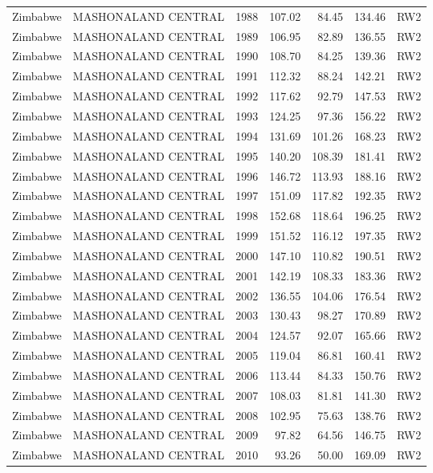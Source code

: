 \begin{longtable}{lllrrrl}
  Zimbabwe & MASHONALAND CENTRAL & 1988 & 107.02 & 84.45 & 134.46 & RW2 \\ 
  Zimbabwe & MASHONALAND CENTRAL & 1989 & 106.95 & 82.89 & 136.55 & RW2 \\ 
  Zimbabwe & MASHONALAND CENTRAL & 1990 & 108.70 & 84.25 & 139.36 & RW2 \\ 
  Zimbabwe & MASHONALAND CENTRAL & 1991 & 112.32 & 88.24 & 142.21 & RW2 \\ 
  Zimbabwe & MASHONALAND CENTRAL & 1992 & 117.62 & 92.79 & 147.53 & RW2 \\ 
  Zimbabwe & MASHONALAND CENTRAL & 1993 & 124.25 & 97.36 & 156.22 & RW2 \\ 
  Zimbabwe & MASHONALAND CENTRAL & 1994 & 131.69 & 101.26 & 168.23 & RW2 \\ 
  Zimbabwe & MASHONALAND CENTRAL & 1995 & 140.20 & 108.39 & 181.41 & RW2 \\ 
  Zimbabwe & MASHONALAND CENTRAL & 1996 & 146.72 & 113.93 & 188.16 & RW2 \\ 
  Zimbabwe & MASHONALAND CENTRAL & 1997 & 151.09 & 117.82 & 192.35 & RW2 \\ 
  Zimbabwe & MASHONALAND CENTRAL & 1998 & 152.68 & 118.64 & 196.25 & RW2 \\ 
  Zimbabwe & MASHONALAND CENTRAL & 1999 & 151.52 & 116.12 & 197.35 & RW2 \\ 
  Zimbabwe & MASHONALAND CENTRAL & 2000 & 147.10 & 110.82 & 190.51 & RW2 \\ 
  Zimbabwe & MASHONALAND CENTRAL & 2001 & 142.19 & 108.33 & 183.36 & RW2 \\ 
  Zimbabwe & MASHONALAND CENTRAL & 2002 & 136.55 & 104.06 & 176.54 & RW2 \\ 
  Zimbabwe & MASHONALAND CENTRAL & 2003 & 130.43 & 98.27 & 170.89 & RW2 \\ 
  Zimbabwe & MASHONALAND CENTRAL & 2004 & 124.57 & 92.07 & 165.66 & RW2 \\ 
  Zimbabwe & MASHONALAND CENTRAL & 2005 & 119.04 & 86.81 & 160.41 & RW2 \\ 
  Zimbabwe & MASHONALAND CENTRAL & 2006 & 113.44 & 84.33 & 150.76 & RW2 \\ 
  Zimbabwe & MASHONALAND CENTRAL & 2007 & 108.03 & 81.81 & 141.30 & RW2 \\ 
  Zimbabwe & MASHONALAND CENTRAL & 2008 & 102.95 & 75.63 & 138.76 & RW2 \\ 
  Zimbabwe & MASHONALAND CENTRAL & 2009 & 97.82 & 64.56 & 146.75 & RW2 \\ 
  Zimbabwe & MASHONALAND CENTRAL & 2010 & 93.26 & 50.00 & 169.09 & RW2 \\ 

\end{longtable}

